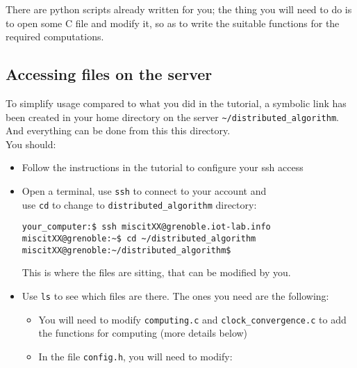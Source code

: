 \documentclass{article}
\begin{document}
There are python scripts already written for you; the thing you will need to do
is to open some C file and modify it, so as to write the suitable functions for
the required computations.

\subsection{Accessing files on the server}

To simplify usage compared to what you did in the tutorial, a symbolic link has been
created in your home directory on the server \verb=~/distributed_algorithm=.
And everything can be done from this this directory.\\


You should:
\begin{itemize}
\item Follow the instructions in the tutorial to configure your ssh access
\item Open a terminal, use \verb=ssh= to connect to your account and \\
    use \verb=cd= to change to \verb=distributed_algorithm= directory:
    \begin{verbatim}your_computer:$ ssh miscitXX@grenoble.iot-lab.info
miscitXX@grenoble:~$ cd ~/distributed_algorithm
miscitXX@grenoble:~/distributed_algorithm$
\end{verbatim}
This is where the files are sitting, that can be modified by you.

\item Use \verb=ls= to see which files are there. The ones you need are the following:
	\begin{itemize}
	\item You will need to modify \verb=computing.c= and \verb=clock_convergence.c= to add the functions for computing (more details below)
	\item In the file \verb=config.h=, you will need to modify:
		\begin{itemize}


\end{itemize}
\end{itemize}
\end{itemize}
\end{document}
